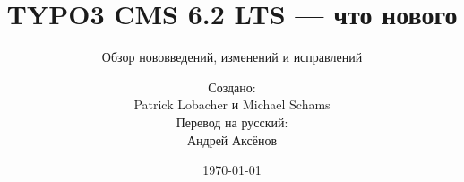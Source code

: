 %

%
%
\documentclass[t]{beamer}

\beamertemplatenavigationsymbolsempty

{
	\usetheme{typo3slides}
}

\title{TYPO3 CMS 6.2 LTS — что нового}
\subtitle{Обзор нововведений, изменений и исправлений}
\author{
	\centerline{Создано:}
	\centerline{Patrick Lobacher и Michael Schams}
	\vspace{0.4cm}
	\centerline{Перевод на русский:}
	Андрей Аксёнов
}
\date{\today}



\sharefont


\begingroup
	[default]
	\begin{frame}
		\titlepage
	\end{frame}
\endgroup



\section*{TYPO3 CMS 6.2 LTS — что нового}
\begin{frame}[fragile]
	\frametitle{Обзор содержания}
	\framesubtitle{Обзор содержания}

	\begin{multicols}{2}
		\tableofcontents
	\end{multicols}

\end{frame}

